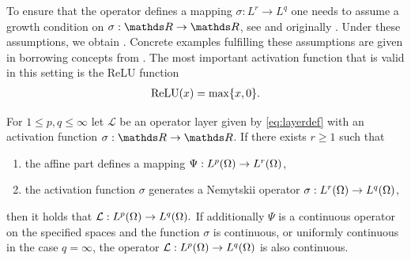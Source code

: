 To ensure that the \Nem{} operator defines a mapping $\sigma:L^r\to L^q$ one needs to assume a growth condition on $\sigma:\R\to\R$, see \cite[Eq. 4]{kabri2023resolution} and originally \cite{tröltzsch}. Under these assumptions, we obtain \cite[Prop. 1]{kabri2023resolution}. Concrete examples fulfilling these assumptions are given in \cite{kabri2023resolution} borrowing concepts from \cite{ambrosetti, tröltzsch}. The most important activation function that is valid in this setting is the ReLU function
%
\begin{align*}
\operatorname{ReLU}(x) = \max\{x, 0\}.
\end{align*}
%
%
\begin{proposition}{\cite[Prop. 1]{kabri2023resolution}}{}
	For $1 \leq p, q \leq \infty$ let $\mathcal{L}$ be an operator layer given by \eqref{eq:layerdef} with an activation function $\sigma: \R \rightarrow \R$.
	If there exists $r \geq 1$ such that
	\begin{enumerate}[label=(\roman*)]
		\item the affine part defines a mapping $\Psi: L^p(\Omega) \rightarrow L^r(\Omega)$,
		\item the activation function $\sigma$ generates a Nemytskii operator $\sigma: L^r(\Omega) \rightarrow L^q(\Omega)$,
	\end{enumerate}
	then it holds that
	$
	\mathcal{L}: L^p(\Omega) \rightarrow L^q(\Omega).
	$
	If additionally $\Psi$ is a continuous operator on the specified spaces and the function $\sigma$ is continuous, or uniformly continuous in the case $q=\infty$, the operator $\mathcal{L}: L^p(\Omega) \rightarrow L^q(\Omega)$ is also continuous.
\end{proposition}
%
%
